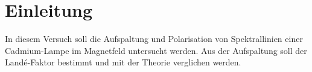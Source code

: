\section{Einleitung}

In diesem Versuch soll die Aufspaltung und Polarisation von Spektrallinien einer Cadmium-Lampe im Magnetfeld untersucht werden.
Aus der Aufspaltung soll der Landé-Faktor bestimmt und mit der Theorie verglichen werden.